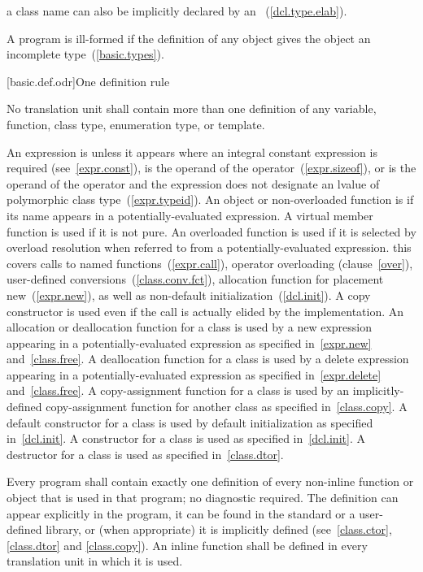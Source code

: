 \pnum
\enternote a class name can also be implicitly declared by an
~(\ref{dcl.type.elab}).
\exitnote

\pnum
{}%
A program is ill-formed if the definition of any object gives the object
an incomplete type~(\ref{basic.types}).

%
%
%
%
%
[basic.def.odr]{One definition rule}

\pnum
No translation unit shall contain more than one definition of any
variable, function, class type, enumeration type, or template.

\pnum
An expression is  unless it appears where
an integral constant expression is required (see~\ref{expr.const}),
is the operand of the  operator~(\ref{expr.sizeof}),
or is the operand of the  operator and the expression does not
designate an lvalue of polymorphic class type~(\ref{expr.typeid}).
An object or non-overloaded function is  if its name appears in
a potentially-evaluated expression. A virtual member
function is used if it is not pure.
An overloaded function is used if it is selected by overload resolution
when referred to from a potentially-evaluated expression.
\enternote this covers calls to named
functions~(\ref{expr.call}), operator overloading (clause~\ref{over}),
user-defined conversions~(\ref{class.conv.fct}), allocation function for
placement new~(\ref{expr.new}), as well as non-default
initialization~(\ref{dcl.init}). A copy constructor is used even if the
call is actually elided by the implementation. \exitnote An allocation
or deallocation function for a class is used by a new expression
appearing in a potentially-evaluated expression as specified
in~\ref{expr.new} and~\ref{class.free}. A deallocation function for a
class is used by a delete expression appearing in a
potentially-evaluated expression as specified in~\ref{expr.delete}
and~\ref{class.free}. 
A copy-assignment function for a class is used by an implicitly-defined
copy-assignment function for another class as specified
in~\ref{class.copy}. A default constructor for a class is used by
default initialization as specified
in~\ref{dcl.init}. A constructor for a class is used as specified
in~\ref{dcl.init}. A destructor for a class is used as specified
in~\ref{class.dtor}.

\pnum
Every program shall contain exactly one definition of every non-inline
function or object that is used in that program; no diagnostic required.
The definition can appear explicitly in the program, it can be found in
the standard or a user-defined library, or (when appropriate) it is
implicitly defined (see~\ref{class.ctor}, \ref{class.dtor} and
\ref{class.copy}). An inline function shall be defined in every
translation unit in which it is used.

